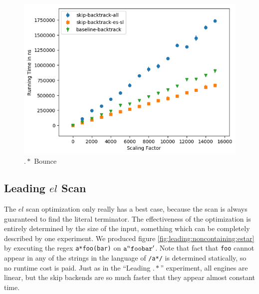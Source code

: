 \begin{figure}
\caption{$.*$ Bounce}
\label{fig:dotstar:bounce}

\includegraphics{resources/dotstar-bounce.png}
\end{figure}

\subsection{Leading $el$ Scan}

The $el$ scan optimization only really has a best case, because
the scan is always guaranteed to find the literal terminator. The
effectiveness of the optimization is entirely determined by the
size of the input, something which can be completely described
by one experiment. We produced figure \ref{fig:leading:noncontaining:estar}
by executing the regex \verb'a*foo(bar)' on ${\tt a}^n{\tt foobar}'$.
Note that fact that \verb'foo' cannot appear in any of the strings
in the language of \verb'/a*/' is determined statically, so no
runtime cost is paid. Just as in the ``Leading $.*$'' experiment,
all engines are linear, but the skip backends are so much faster that
they appear almost constant time.


